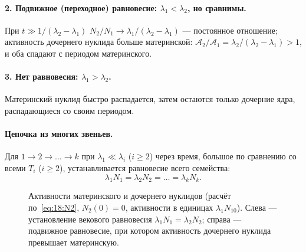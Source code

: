 \paragraph{2. Подвижное (переходное) равновесие: $\lambda_1<\lambda_2$, но сравнимы.} При $t\gg1/(\lambda_2-\lambda_1)$
$N_2/N_1\to\lambda_1/(\lambda_2-\lambda_1)$ — постоянное отношение; активность дочернего нуклида больше материнской:
$\mathcal A_2/\mathcal A_1=\lambda_2/(\lambda_2-\lambda_1)>1$, и оба спадают с периодом материнского.

\paragraph{3. Нет равновесия: $\lambda_1>\lambda_2$.} Материнский нуклид быстро распадается, затем остаются только дочерние
ядра, распадающиеся со своим периодом.

\paragraph{Цепочка из многих звеньев.} Для $1\to2\to\dots\to k$ при $\lambda_1\ll\lambda_i$ ($i\ge2$) через время, большое по сравнению
со всеми $T_i$ ($i\ge2$), устанавливается равновесие всего семейства:
\begin{equation}\label{eq:18:family}
  \lambda_1N_1=\lambda_2N_2=\dots=\lambda_kN_k .
\end{equation}

\begin{figure}[htbp]
\centering
{}\hfill
{}
\caption{Активности материнского и дочернего нуклидов (расчёт по~\eqref{eq:18:N2}, $N_2(0)=0$, активности в единицах
$\lambda_1N_{10}$). Слева — установление векового равновесия $\lambda_1N_1=\lambda_2N_2$; справа — подвижное равновесие,
при котором активность дочернего нуклида превышает материнскую.}
\label{fig:18:chain}
\end{figure}

